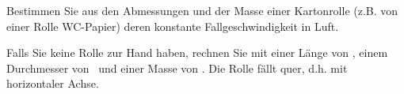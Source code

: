 Bestimmen Sie aus den Abmessungen und der Masse einer Kartonrolle (z.B. von einer Rolle WC-Papier) deren konstante Fallgeschwindigkeit in Luft.

Falls Sie keine Rolle zur Hand haben, rechnen Sie mit einer Länge von \lRoO, einem Durchmesser von \dRoO\ und einer Masse von \mRoO. Die Rolle fällt quer, d.h. mit horizontaler Achse.
